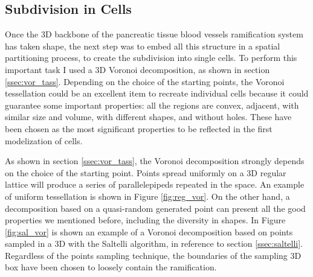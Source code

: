 \subsection{Subdivision in Cells}
    Once the 3D backbone of the pancreatic tissue blood vessels ramification system has taken shape, the next step was to embed all this structure in a spatial partitioning process, to create the subdivision into single cells. To perform this important task I used a 3D Voronoi decomposition, as shown in section \ref{ssec:vor_tass}. Depending on the choice of the starting points, the Voronoi tessellation could be an excellent item to recreate individual cells because it could guarantee some important properties: all the regions are convex, adjacent, with similar size and volume, with different shapes, and without holes. These have been chosen as the most significant properties to be reflected in the first modelization of cells.

    As shown in section \ref{ssec:vor_tass}, the Voronoi decomposition strongly depends on the choice of the starting point. Points spread uniformly on a 3D regular lattice will produce a series of parallelepipeds repeated in the space. An example of uniform tessellation is shown in Figure \ref{fig:reg_vor}. On the other hand, a decomposition based on a quasi-random generated point can present all the good properties we mentioned before, including the diversity in shapes. In Figure \ref{fig:sal_vor} is shown an example of a Voronoi decomposition based on points sampled in a 3D with the Saltelli algorithm, in reference to section \ref{ssec:saltelli}. Regardless of the points sampling technique, the boundaries of the sampling 3D box have been chosen to loosely contain the ramification.

